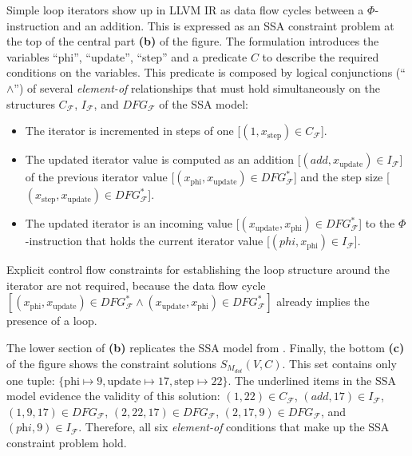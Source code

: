     Simple loop iterators show up in LLVM IR as data flow cycles between a
    $\Phi$-instruction and an addition.
    This is expressed as an SSA constraint problem at the top of the central
    part {\bf(b)} of the figure.
    The formulation introduces the variables
    ``phi'', ``update'', ``step'' and a predicate $C$ to describe the
    required conditions on the variables.
    This predicate is composed by logical conjunctions (``$\land$'') of
    several {\em element-of} relationships that must hold simultaneously on
    the structures $C_\mathcal F$, $I_\mathcal F$, and $DFG_\mathcal F$ of
    the SSA model:
    \begin{itemize}
        \item The iterator is incremented in steps of one
              [$(1,x_\text{step})\in C_\mathcal{F}$].
        \item The updated iterator value is computed as an addition
              [$(add,x_\text{update})\in I_\mathcal{F}$] of the previous
              iterator value
              [$(x_\text{phi},x_\text{update})\in DFG_\mathcal{F}^*$] and the
              step size
              [$(x_\text{step},x_\text{update})\in DFG_\mathcal{F}^*$].
        \item The updated iterator is an incoming value
              [$(x_\text{update},x_\text{phi})\in DFG_\mathcal{F}^*$] to the
              $\Phi$-instruction that holds the current iterator value
              [$(phi,x_\text{phi})\in I_\mathcal{F}$].
    \end{itemize}
    Explicit control flow constraints for establishing the loop structure around
    the iterator are not required, because the data flow cycle
    $[(x_\text{phi},x_\text{update})\in DFG_\mathcal{F}^*\mathrel\land(x_\text{update},x_\text{phi})\in DFG_\mathcal{F}^*]$
    already implies the presence of a loop.

    The lower section of  {\bf(b)} replicates the
    SSA model from .
    Finally, the bottom {\bf(c)} of the figure shows the constraint solutions
    $S_{M_{dot}}(V,C)$.
    This set contains only one tuple:
    $\{\text{phi}\mapsto9,\text{update}\mapsto17,\text{step}\mapsto22\}$.
    The underlined items in the SSA model evidence the validity of this
    solution:
    $(1,22)\in C_\mathcal F$,
    $(\textit{add},17)\in I_\mathcal F$,
    $(1,9,17)\in DFG_\mathcal F$,
    $(2,22,17)\in DFG_\mathcal F$,
    $(2,17,9)\in DFG_\mathcal F$, and
    $(\textit{phi},9)\in I_\mathcal F$.
    Therefore, all six {\it element-of} conditions that make up the SSA
    constraint problem hold.

